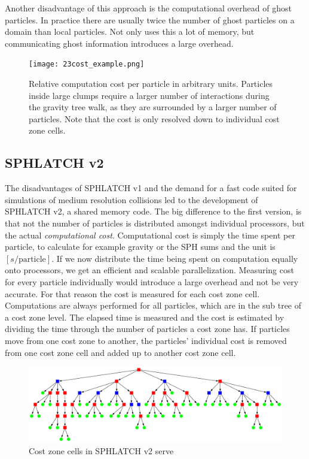 Another disadvantage of this approach is the computational overhead of ghost particles. In practice there are usually twice the number of ghost particles on a domain than local particles. Not only uses this a lot of memory, but communicating ghost information introduces a large overhead. 

\begin{figure}[htbp]
\begin{center}
\texttt{[image: 23cost\_example.png]}
\caption{Relative computation cost per particle in arbitrary units. Particles inside large clumps require a larger number of interactions during the gravity tree walk, as they are surrounded by a larger number of particles. Note that the cost is only resolved down to individual cost zone cells.}
\label{ch02_fig23}
\end{center}
\end{figure}

\subsection{SPHLATCH v2}
The disadvantages of SPHLATCH v1 and the demand for a fast code suited for simulations of medium resolution collisions led to the development of SPHLATCH v2, a shared memory code. The big difference to the first version, is that not the number of particles is distributed amongst individual processors, but the actual \emph{computational cost}. Computational cost is simply the time spent per particle, to calculate for example gravity or the SPH sums and the unit is $[s / \text{particle}]$. If we now distribute the time being spent on computation equally onto processors, we get an efficient and scalable parallelization. Measuring cost for every particle individually would introduce a large overhead and not be very accurate. For that reason the cost is measured for each cost zone cell. Computations are always performed for all particles, which are in the sub tree of a cost zone level. The elapsed time is measured and the cost is estimated by dividing the time through the number of particles a cost zone has. If particles move from one cost zone to another, the particles' individual cost is removed from one cost zone cell and added up to another cost zone cell.

\begin{figure}[htbp]
\begin{center}
\includegraphics[scale=0.3]{27algo_quadtree_sphlatchv2.pdf}
\caption{Cost zone cells in SPHLATCH v2 serve }
\label{ch02_fig27}
\end{center}
\end{figure}

